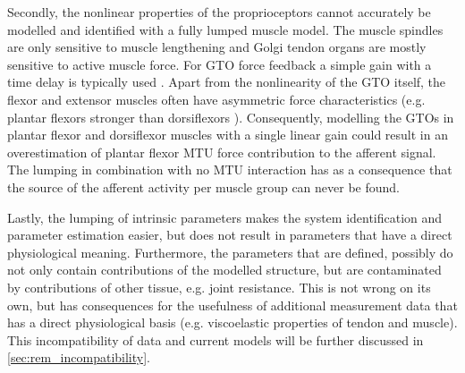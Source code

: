 Secondly, the nonlinear properties of the proprioceptors cannot accurately be modelled and identified with a fully lumped muscle model. The muscle spindles are only sensitive to muscle lengthening and Golgi tendon organs are mostly sensitive to active muscle force. For GTO force feedback a simple gain with a time delay is typically used \cite{schouten_nmclab_2008, mugge_rigorous_2010}. Apart from the nonlinearity of the GTO itself, the flexor and extensor muscles often have asymmetric force characteristics (e.g. plantar flexors stronger than dorsiflexors \cite{fukunaga_specific_1996}). Consequently, modelling the GTOs in plantar flexor and dorsiflexor muscles with a single linear gain could result in an overestimation of plantar flexor MTU force contribution to the afferent signal. The lumping in combination with no MTU interaction has as a consequence that the source of the afferent activity per muscle group can never be found. 

Lastly, the lumping of intrinsic parameters makes the system identification and parameter estimation easier, but does not result in parameters that have a direct physiological meaning. Furthermore, the parameters that are defined, possibly do not only contain contributions of the modelled structure, but are contaminated by contributions of other tissue, e.g. joint resistance. This is not wrong on its own, but has consequences for the usefulness of additional measurement data that has a direct physiological basis (e.g. viscoelastic properties of tendon and muscle). This incompatibility of data and current models will be further discussed in \autoref{sec:rem_incompatibility}. 
















\begin{landscape}



\end{landscape}
